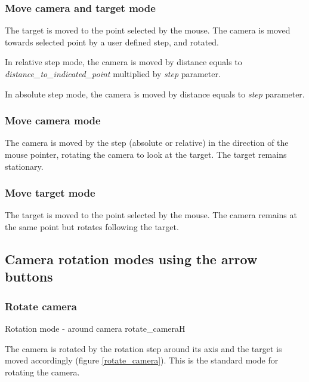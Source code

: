 \subsubsection{Move camera and target mode}\label{move-camera-and-target-mode-1}

The target is moved to the point selected by the mouse. The camera is moved towards selected point by a user defined step, and rotated.

In relative step mode, the camera is moved by distance equals to
\emph{distance\_to\_indicated\_point} multiplied by \emph{step} parameter.

In absolute step mode, the camera is moved by distance equals to \emph{step}
parameter.

\subsubsection{Move camera mode}\label{move-camera-mode-1}

The camera is moved by the step (absolute or relative) in the direction of the
mouse pointer, rotating the camera to look at the target. The target remains
stationary.

\subsubsection{Move target mode}\label{move-target-mode-1}

The target is moved to the point selected by the mouse. The camera remains at
the same point but rotates following the target.

\subsection{Camera rotation modes using the arrow buttons}\label{camera-rotation-modes-using-the-arrow-buttons}

\subsubsection{Rotate camera}\label{rotate-camera}

{Rotation mode - around camera}
{rotate_camera}{H}

The camera is rotated by the rotation step around its axis and the target is
moved accordingly (figure \ref{rotate_camera}). This is the standard mode for rotating the camera.

